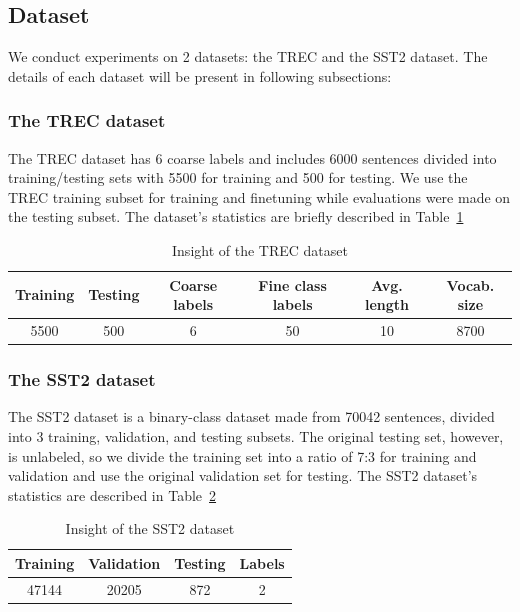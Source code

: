 \documentclass[sn-mathphys,Numbered]{sn-jnl}%
\theoremstyle{thmstyleone}%
\theoremstyle{thmstyletwo}%
\theoremstyle{thmstylethree}%
\begin{document}
\subsection{Dataset}
We conduct experiments on 2 datasets: the TREC and the SST2 dataset. The details of each dataset will be present in following subsections:

\subsubsection{The TREC dataset}
The TREC dataset\cite{hovy2001, li2002} has 6 coarse labels and includes 6000 sentences divided into training/testing sets with 5500 for training and 500 for testing. We use the TREC training subset for training and finetuning while evaluations were made on the testing subset. The dataset’s statistics are briefly described in Table~\ref{tab:trec-insight}

\begin{table}
\centering
\caption{Insight of the TREC dataset} \label{tab:trec-insight}
\begin{tabular*}{\textwidth}{@{\extracolsep\fill}cccccc}
\toprule
\textbf{Training} & \textbf{Testing} & \textbf{Coarse labels} & \textbf{Fine class labels} & \textbf{Avg. length} & \textbf{Vocab. size} \\ \midrule
5500              & 500              & 6                      & 50                         & 10                   & 8700                 \\ \bottomrule
\end{tabular*}
\end{table}

\subsubsection{The SST2 dataset}
The SST2 dataset\cite{Socher2013} is a binary-class dataset made from 70042 sentences, divided into 3 training, validation, and testing subsets. The original testing set, however, is unlabeled, so we divide the training set into a ratio of 7:3 for training and validation and use the original validation set for testing. The SST2 dataset’s statistics are described in Table~\ref{tab:sst2-insight}

\begin{table}
\centering
\caption{Insight of the SST2 dataset} \label{tab:sst2-insight}
\begin{tabular*}{\textwidth}{@{\extracolsep\fill}cccc}
\toprule
\textbf{Training} & \textbf{Validation} & \textbf{Testing} & \textbf{Labels} \\ \midrule
47144              & 20205              & 872                      & 2 \\ \bottomrule
\end{tabular*}
\end{table}
\end{document}
